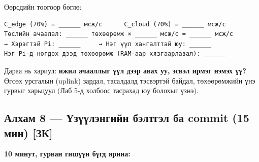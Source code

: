 Өөрсдийн тоогоор бөглө:

\begin{verbatim}
C_edge (70%) = ______ мсж/с      C_cloud (70%) = ______ мсж/с
Төслийн ачаалал: ______ төхөөрөмж × ______ мсж/с = ______ мсж/с
→ Хэрэгтэй Pi: ______     → Нэг үүл хангалттай юу: ______
Нэг Pi-д ногдох дээд төхөөрөмж (RAM-аар хязгаарлавал): ______
\end{verbatim}

Дараа нь хариул: \textbf{ижил ачааллыг үүл дээр авах уу, эсвэл ирмэг нэмэх үү?} Өгсөх урсгалын (uplink) зардал, тасалдалд тэсвэртэй байдал, төхөөрөмжийн үнэ гурвыг харьцуул (Лаб 5-д холбоос тасрахад юу болохыг үзнэ).

\hypertarget{ux430ux43bux445ux430ux43c-8-ux4afux437ux4afux4afux43bux44dux43dux433ux438ux439ux43d-ux431ux44dux43bux442ux433ux44dux43b-ux431ux430-commit-15-ux43cux438ux43d-ux437ux43a}{%
\subsection{Алхам 8 --- Үзүүлэнгийн бэлтгэл ба commit (15 мин) {[}ЗК{]}}\label{ux430ux43bux445ux430ux43c-8-ux4afux437ux4afux4afux43bux44dux43dux433ux438ux439ux43d-ux431ux44dux43bux442ux433ux44dux43b-ux431ux430-commit-15-ux43cux438ux43d-ux437ux43a}}

\textbf{10 минут, гурван гишүүн бүгд ярина:}

